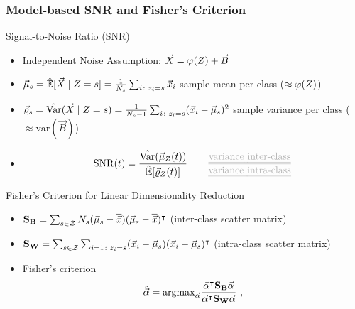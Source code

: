 \begin{frame}
\frametitle{Model-based SNR and Fisher's Criterion}
\begin{block}{Signal-to-Noise Ratio (SNR)}
\begin{itemize}
\item Independent Noise Assumption: $\vec{X} = \varphi(Z)+\vec{B}$

\item $\mmmXclass= \esperEst[\given{\vaLeakVec}{\sensRandVar = \sensVarGenValue}] = \frac{1}{\nbTracesPerClass}\sum_{i\colon \sensVar_i=\sensVarGenValue} \vLeakVec_i $ sample mean per class ($\approx \varphi(Z)$)
\item $\varXclass = \varEst(\given{\vaLeakVec}{\sensRandVar = \sensVarGenValue}) = \frac{1}{\nbTracesPerClass-1}\sum_{i\colon \sensVar_i=\sensVarGenValue} (\vLeakVec_i - \mmmXclass)^2 $ sample variance per class ($\approx \mathrm{var}(\vec{B})$) 
\item \begin{equation*}\mathrm{SNR}(t) = \frac{\varEst(\mmmXclass[Z](t))}{\esperEst[\varXclass[Z](t)]} \qquad \textcolor{grey}{\frac{\text{\emph{variance inter-class}}}{\text{\emph{variance intra-class}}}} \end{equation*}
\end{itemize}
\end{block}

\begin{block}{Fisher's Criterion for Linear Dimensionality Reduction}

\begin{itemize}
\item $\textbf{S}_{\textbf{B}} = \sum_{s\in\mathcal{Z}}N_{s}(\vec{\mu}_{s}-\overline{\vec{x}})(\vec{\mu}_{s}-\overline{\vec{x}})^\intercal $ (inter-class scatter matrix)
\item $\textbf{S}_{\textbf{W}} = \sum_{s\in\mathcal{Z}}\sum_{i=1\colon z_i=s}(\vec{x}_i-\vec{\mu}_{s})(\vec{x}_i-\vec{\mu}_{s})^\intercal$ (intra-class scatter matrix)
\item Fisher's criterion
 \begin{equation}\label{eq:LDA}
\hat{ \vec{\alpha}}=\mathrm{argmax}_{\vec{\alpha}} \frac{\vec{\alpha}^\intercal \textbf{S}_{\textbf{B}} \vec{\alpha}}{\vec{\alpha}^\intercal \textbf{S}_{\textbf{W}} \vec{\alpha}} \mbox{ ,}
 \end{equation}
\end{itemize}

\end{block}
\end{frame}

